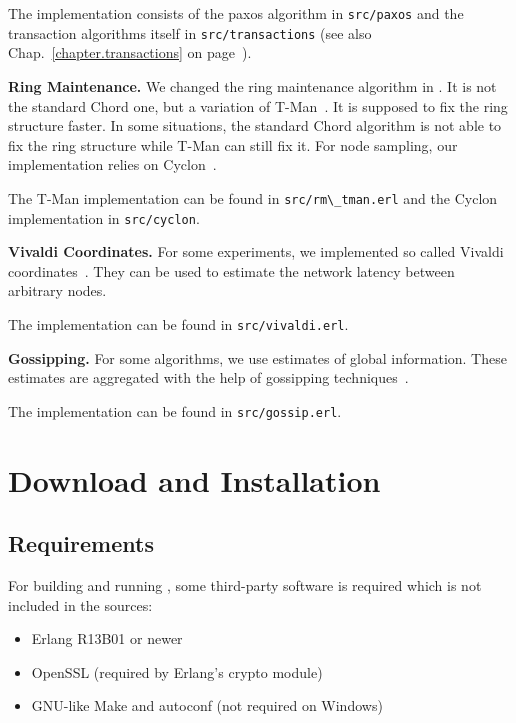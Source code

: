 \documentclass[a4paper]{scrreprt}
\newcommand{\sieheref}[1]{\ref{#1} on page~\pageref{#1}}
\newcommand{\code}[1]{\lstinline[basicstyle=\ttfamily]!#1!}
\begin{document}
The implementation consists of the paxos algorithm in \code{src/paxos} and
the transaction algorithms itself in \code{src/transactions} (see also
Chap.~\sieheref{chapter.transactions}).

{\bf Ring Maintenance.} We changed the ring maintenance algorithm in
\scalaris{}. It is not the standard Chord one, but a variation of
T-Man~\cite{t-man}. It is supposed to fix the ring structure
faster. In some situations, the standard Chord algorithm is not able
to fix the ring structure while T-Man can still fix it. For node sampling,
our implementation relies on Cyclon~\cite{cyclon}.

The T-Man implementation can be found in \code{src/rm\_tman.erl} and
the Cyclon implementation in \code{src/cyclon}.

{\bf Vivaldi Coordinates.} For some experiments, we implemented so
called Vivaldi coordinates~\cite{vivaldi}. They can be used to
estimate the network latency between arbitrary nodes.

The implementation can be found in \code{src/vivaldi.erl}.

{\bf Gossipping.} For some algorithms, we use estimates of global
information. These estimates are aggregated with the help of
gossipping techniques~\cite{gossip}.

The implementation can be found in \code{src/gossip.erl}.



\chapter{Download and Installation}

\section{Requirements}
\label{sec.requirements}

For building and running \scalaris{}, some third-party software is
required which is not included in the \scalaris{} sources:

\begin{itemize}
\setlength{\itemsep}{0pt}
\setlength{\parskip}{0pt}
\item Erlang R13B01 or newer
\item OpenSSL (required by Erlang's crypto module)
\item GNU-like Make and autoconf (not required on Windows)
\end{itemize}
\end{document}
